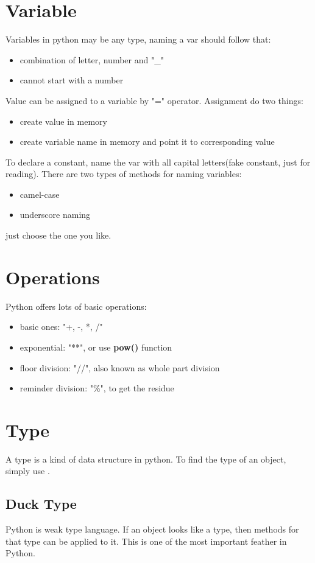 \documentclass[10pt,a4paper,oneside]{article}
\begin{document}
\section{Variable}
Variables in python may be any type, naming a var should follow that:
\begin{itemize}
	\item combination of letter, number and "\_"
	\item cannot start with a number
\end{itemize}
Value can be assigned to a variable by "=" operator. Assignment do two things:
\begin{itemize}
	\item create value in memory
	\item create variable name in memory and point it to corresponding value
\end{itemize}
To declare a constant, name the var with all capital letters(fake constant, just for reading). There are two types of methods for naming variables:
\begin{itemize}
	\item camel-case
	\item underscore naming
\end{itemize}  
just choose the one you like.


\section{Operations}
Python offers lots of basic operations:
\begin{itemize}
	\item basic ones: "+, -, *, /"
	\item exponential: "**", or use \textbf{pow()} function
	\item floor division: "//", also known as whole part division
	\item reminder division: "\%", to get the residue
\end{itemize}

\section{Type}
A type is a kind of data structure in python. To find the type of an object, simply use .

\subsection{Duck Type}
Python is weak type language. If an object looks like a type, then methods for that type can be applied to it. This is one of the most important feather in Python.
\end{document}
